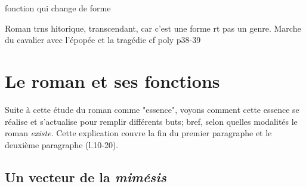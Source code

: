 \documentclass[a4paper,10pt]{article}
\begin{document}
		
	fonction qui change de forme
	
	Roman trns hitorique, transcendant, car c'est une forme rt pas un genre. Marche du cavalier avec l'épopée et la tragédie cf poly p38-39
	

	\section{Le roman et ses fonctions}
		Suite à cette étude du roman comme "essence", voyons comment cette essence se réalise et s'actualise pour remplir différents buts; bref, selon quelles modalités le roman \textit{existe}. Cette explication couvre la fin du premier paragraphe et le deuxième paragraphe (l.10-20).
		\subsection{Un vecteur de la \textit{mimésis}}
\end{document}
